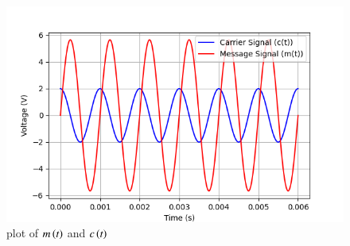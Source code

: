 \documentclass[journal,12pt,twocolumn]{IEEEtran}
\begin{document}
\begin{figure}[ht]
    \centering
        \includegraphics[width=\columnwidth]{2021/EC/49/figs/Figure_1.png}
    \caption{plot of $m\left(t\right)$ and $c\left(t\right)$}
\end{figure}

\end{document}
